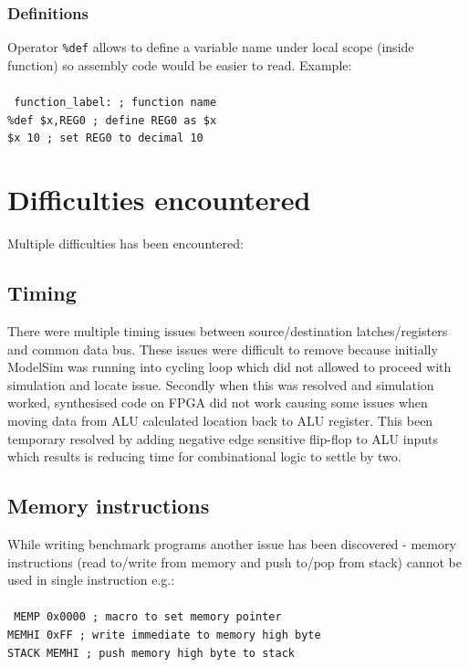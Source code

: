 \documentclass[a4paper,12pt]{article}
\begin{document}
\subsubsection{Definitions}
Operator \texttt{\%def} allows to define a variable name under local scope (inside function) so assembly code would be easier to read. Example:
\\\\
\texttt{
function\_label: \quad; function name\\
\%def \$x,REG0  \qquad; define REG0 as \$x\\
\$x 10			\qquad\qquad; set REG0 to decimal 10 \\
} 


\section{Difficulties encountered}
Multiple difficulties has been encountered:

\subsection{Timing}
There were multiple timing issues between source/destination latches/registers and common data bus. These issues were difficult to remove because initially ModelSim was running into cycling loop which did not allowed to proceed with simulation and locate issue. 
Secondly when this was resolved and simulation worked, synthesised code on FPGA did not work causing some issues when moving data from ALU calculated location back to ALU register. This been temporary resolved by adding negative edge sensitive flip-flop to ALU inputs which results is reducing time for combinational logic to settle by two.

\subsection{Memory instructions}
While writing benchmark programs another issue has been discovered - memory instructions (read to/write from memory and push to/pop from stack) cannot be used in single instruction e.g.: \\\\
\texttt{
	MEMP  0x0000	\quad; macro to set memory pointer\\
	MEMHI 0xFF		\quad; write immediate to memory high byte \\
	STACK MEMHI		\quad; push memory high byte to stack \\
} 
\end{document}
